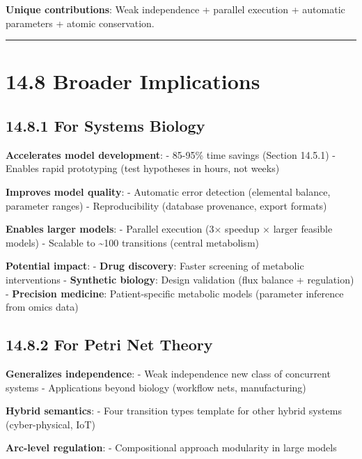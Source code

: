 \textbf{Unique contributions}: Weak independence + parallel execution +
automatic parameters + atomic conservation.

\begin{center}\rule{0.5\linewidth}{0.5pt}\end{center}

\hypertarget{broader-implications}{%
\section{14.8 Broader Implications}\label{broader-implications}}

\hypertarget{for-systems-biology}{%
\subsection{14.8.1 For Systems Biology}\label{for-systems-biology}}

\textbf{Accelerates model development}: - 85-95\% time savings (Section
14.5.1) - Enables rapid prototyping (test hypotheses in hours, not
weeks)

\textbf{Improves model quality}: - Automatic error detection (elemental
balance, parameter ranges) - Reproducibility (database provenance,
export formats)

\textbf{Enables larger models}: - Parallel execution (3× speedup ×
larger feasible models) - Scalable to \textasciitilde100 transitions
(central metabolism)

\textbf{Potential impact}: - \textbf{Drug discovery}: Faster screening
of metabolic interventions - \textbf{Synthetic biology}: Design
validation (flux balance + regulation) - \textbf{Precision medicine}:
Patient-specific metabolic models (parameter inference from omics data)

\hypertarget{for-petri-net-theory}{%
\subsection{14.8.2 For Petri Net Theory}\label{for-petri-net-theory}}

\textbf{Generalizes independence}: - Weak independence \textrightarrow new class of
concurrent systems - Applications beyond biology (workflow nets,
manufacturing)

\textbf{Hybrid semantics}: - Four transition types \textrightarrow template for other
hybrid systems (cyber-physical, IoT)

\textbf{Arc-level regulation}: - Compositional approach \textrightarrow modularity in
large models

